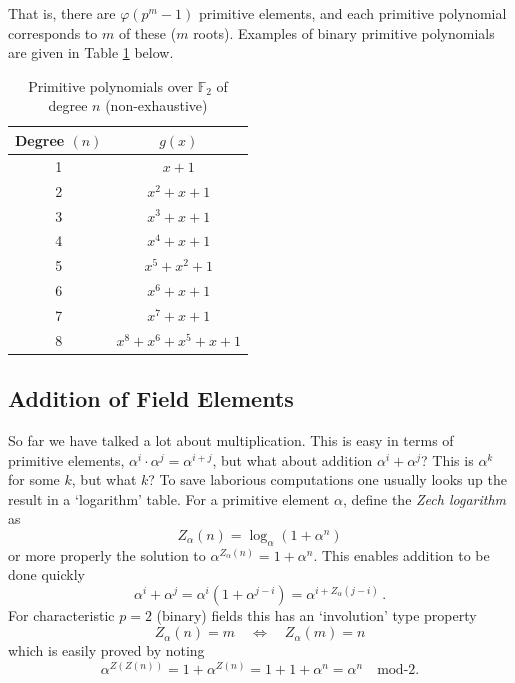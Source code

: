 \documentclass[twocolumn]{revtex4-2}
\begin{document}
That is, there are $\varphi(p^m - 1)$ primitive elements, and each primitive polynomial corresponds to $m$ of these ($m$ roots). Examples of binary primitive polynomials are given in Table \ref{tab:primitivepoly} below.
\begin{table}[ht] 
\centering 
\begin{tabular}{c c} 
\hline
Degree $(n)$ & $g(x)$ \\ 
\hline
1 & $x + 1$ \\ 
2 & $x^2 + x + 1$ \\ 
3 & $x^3 + x + 1$ \\ 
4 & $x^4 + x + 1$ \\ 
5 & $x^5 + x^2 + 1$ \\ 
6 & $x^6 + x + 1$ \\ 
7 & $x^7 + x + 1$ \\ 
8 & $x^8 + x^6 + x^5 + x + 1$ \\
\hline 
\end{tabular} 
\caption{Primitive polynomials over $\mathbb{F}_2$ of degree $n$ (non-exhaustive)} 
\label{tab:primitivepoly} 
\end{table}

\subsection{Addition of Field Elements}
\label{sec:logarithms}
So far we have talked a lot about multiplication. This is easy in terms of primitive elements, $\alpha^i \cdot \alpha^j = \alpha^{i+j}$, but what about addition $\alpha^i + \alpha^j$?
This is $\alpha^k$ for some $k$, but what $k$? To save laborious computations one usually looks up the result in a `logarithm' table.
For a primitive element $\alpha$, define the \emph{Zech logarithm} as
\begin{equation}
    Z_\alpha(n) = \log_{\alpha}(1+\alpha^n)
\end{equation}
or more properly the solution to $\alpha^{Z_\alpha(n)} = 1 + \alpha^n$. This enables addition to be done quickly
\begin{equation}
    \alpha^i + \alpha^j = \alpha^i ( 1 + \alpha^{j-i}) = \alpha^{i + Z_{\alpha}(j-i)} \, .
\end{equation}
For characteristic $p=2$ (binary) fields this has an `involution' type property
\begin{equation}
    Z_\alpha(n) = m \quad \Longleftrightarrow \quad Z_\alpha(m) = n
\end{equation}
which is easily proved by noting 
\begin{equation}
\alpha^{Z(Z(n))} = 1 + \alpha^{Z(n)} = 1 + 1 + \alpha^n = \alpha^n \quad \text{mod-}2.
\end{equation}
\end{document}
